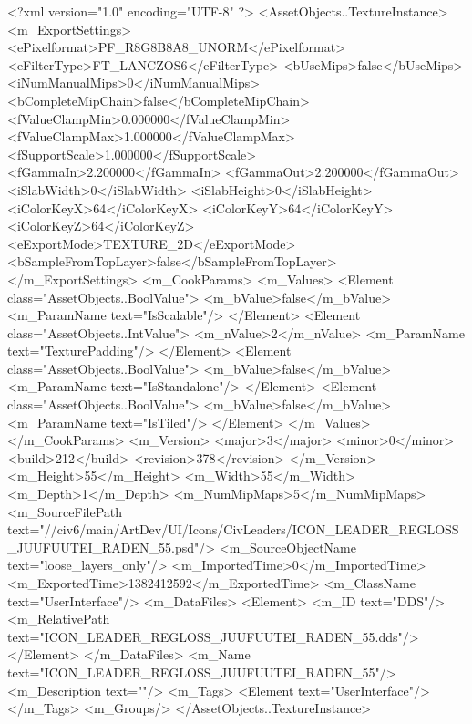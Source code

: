<?xml version="1.0" encoding="UTF-8" ?>
<AssetObjects..TextureInstance>
	<m_ExportSettings>
		<ePixelformat>PF_R8G8B8A8_UNORM</ePixelformat>
		<eFilterType>FT_LANCZOS6</eFilterType>
		<bUseMips>false</bUseMips>
		<iNumManualMips>0</iNumManualMips>
		<bCompleteMipChain>false</bCompleteMipChain>
		<fValueClampMin>0.000000</fValueClampMin>
		<fValueClampMax>1.000000</fValueClampMax>
		<fSupportScale>1.000000</fSupportScale>
		<fGammaIn>2.200000</fGammaIn>
		<fGammaOut>2.200000</fGammaOut>
		<iSlabWidth>0</iSlabWidth>
		<iSlabHeight>0</iSlabHeight>
		<iColorKeyX>64</iColorKeyX>
		<iColorKeyY>64</iColorKeyY>
		<iColorKeyZ>64</iColorKeyZ>
		<eExportMode>TEXTURE_2D</eExportMode>
		<bSampleFromTopLayer>false</bSampleFromTopLayer>
	</m_ExportSettings>
	<m_CookParams>
		<m_Values>
			<Element class="AssetObjects..BoolValue">
				<m_bValue>false</m_bValue>
				<m_ParamName text="IsScalable"/>
			</Element>
			<Element class="AssetObjects..IntValue">
				<m_nValue>2</m_nValue>
				<m_ParamName text="TexturePadding"/>
			</Element>
			<Element class="AssetObjects..BoolValue">
				<m_bValue>false</m_bValue>
				<m_ParamName text="IsStandalone"/>
			</Element>
			<Element class="AssetObjects..BoolValue">
				<m_bValue>false</m_bValue>
				<m_ParamName text="IsTiled"/>
			</Element>
		</m_Values>
	</m_CookParams>
	<m_Version>
		<major>3</major>
		<minor>0</minor>
		<build>212</build>
		<revision>378</revision>
	</m_Version>
	<m_Height>55</m_Height>
	<m_Width>55</m_Width>
	<m_Depth>1</m_Depth>
	<m_NumMipMaps>5</m_NumMipMaps>
	<m_SourceFilePath text="//civ6/main/ArtDev/UI/Icons/CivLeaders/ICON_LEADER_REGLOSS_JUUFUUTEI_RADEN_55.psd"/>
	<m_SourceObjectName text="loose_layers_only"/>
	<m_ImportedTime>0</m_ImportedTime>
	<m_ExportedTime>1382412592</m_ExportedTime>
	<m_ClassName text="UserInterface"/>
	<m_DataFiles>
		<Element>
			<m_ID text="DDS"/>
			<m_RelativePath text="ICON_LEADER_REGLOSS_JUUFUUTEI_RADEN_55.dds"/>
		</Element>
	</m_DataFiles>
	<m_Name text="ICON_LEADER_REGLOSS_JUUFUUTEI_RADEN_55"/>
	<m_Description text=""/>
	<m_Tags>
		<Element text="UserInterface"/>
	</m_Tags>
	<m_Groups/>
</AssetObjects..TextureInstance>

